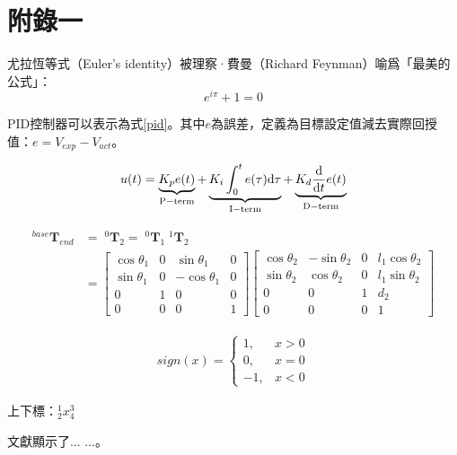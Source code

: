 \clearpage
\appendix
\chapter{附錄一}
\label{appendix}

尤拉恆等式（Euler's identity）被理察·費曼（Richard Feynman）喻爲「最美的公式」：
\begin{equation}
    e^{i \pi} + 1 = 0 \label{euler-identity}
\end{equation}

\vspace{2cm}

PID控制器可以表示為式\eqref{pid}。其中$e$為誤差，定義為目標設定值減去實際回授值：$e=V_{exp}-V_{act}$。

\begin{equation}
    u(t) = \underbrace{K_p e(t)}_{\rm P-term}
         + \underbrace{K_i \int_{0}^{t} e(\tau)\mathrm{d}\tau}_{\rm I-term}
         + \underbrace{K_d \frac{\mathrm{d}}{\mathrm{d}t} e(t)}_{\rm D-term}
    \label{pid}
\end{equation}

\vspace{2cm}

\begin{align}
^{base}\mathbf{T}_{end} &= \; ^0\mathbf{T}_2 = \; ^0\mathbf{T}_1 \; ^1\mathbf{T}_2 \\
&=
\begin{bmatrix}
\cos \theta_1&0&\sin \theta_1&0\\
\sin \theta_1&0&-\cos \theta_1&0\\
0&1&0&0\\
0&0&0&1
\end{bmatrix}
\begin{bmatrix}
\cos \theta_2&-\sin \theta_2&0&l_1\cos \theta_2\\
\sin \theta_2&\cos \theta_2&0&l_1\sin \theta_2\\
0&0&1&d_2\\
0&0&0&1
\end{bmatrix}
\end{align}

\begin{align}
sign(x) =
\left\{
    \begin{array}{rl}
    1, & x>0 \\
    0, & x=0 \\
    -1, & x<0
    \end{array}
\right.
\end{align}

上下標：$^1_2x^3_4$

文獻\cite{test2021}顯示了... ...。
